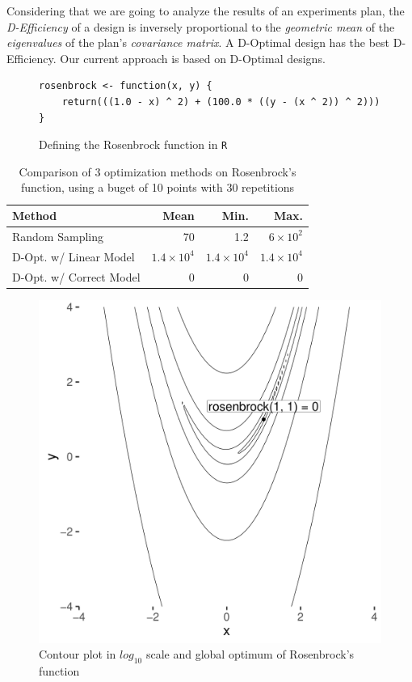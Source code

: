 \documentclass[conference]{IEEEtran}
\begin{document}
Considering that we are going to analyze the results of an experiments plan, the
\emph{D-Efficiency} of a design is inversely proportional to the \emph{geometric mean} of
the \emph{eigenvalues} of the plan's \emph{covariance matrix}. A D-Optimal design has the
best D-Efficiency. Our current approach is based on D-Optimal designs.

\begin{figure}
\lstset{language=r,label= ,caption= ,captionpos=b,numbers=none}
\begin{lstlisting}
rosenbrock <- function(x, y) {
    return(((1.0 - x) ^ 2) + (100.0 * ((y - (x ^ 2)) ^ 2)))
}
\end{lstlisting}
\caption{Defining the Rosenbrock function in \texttt{R}}
\end{figure}

\begin{table}[ht]
\centering
\begingroup\small
\begin{tabular}{lrrr}
  \toprule
Method & Mean & Min. & Max. \\
  \midrule
Random Sampling &  70 & 1.2 & $6 \times 10^{2}$ \\
  D-Opt. w/ Linear Model & $1.4 \times 10^{4}$ & $1.4 \times 10^{4}$ & $1.4 \times 10^{4}$ \\
  D-Opt. w/ Correct Model &   0 &   0 &   0 \\
   \bottomrule
\end{tabular}
\endgroup
\caption{Comparison of 3 optimization methods on Rosenbrock's function, using a buget of 10 points with 30 repetitions}
\end{table}

\begin{center}
\begin{figure}
\begin{center}
\includegraphics[width=.8\columnwidth]{./img/rosenbrock.pdf}
\end{center}
\caption{Contour plot in \(log_{10}\) scale and global optimum of Rosenbrock's function}
\end{figure}
\end{center}
\end{document}
